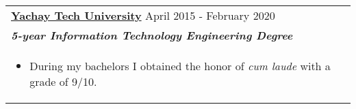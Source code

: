 \documentclass[a4paper,8pt]{article}
\begin{document}
\begin{tabularx}{\linewidth}{ @{}l r@{} }
\color[HTML]{1C033C} \textbf{\uline{Yachay Tech University}} \hfill \color[HTML]{371e77} April 2015 - February 2020 \\[4pt]
\color[HTML]{371e77}\textbf{\textit{5-year Information Technology Engineering Degree}}\ \hfill \color[HTML]{4B28A4} \\[5pt]
\begin{minipage}[t]{\linewidth}
    \begin{itemize}[nosep,after=\strut, leftmargin=2em, itemsep=2pt]
        \item During my bachelors I obtained the honor of \textit{cum laude} with a grade of 9/10.
    \end{itemize}
\end{minipage}
\end{tabularx}

\end{document}
